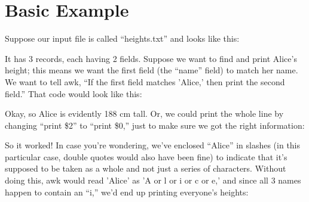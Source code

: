 \documentclass[12pt]{article}
\begin{document}
\pagebreak


\section*{Basic Example}

Suppose our input file is called ``heights.txt'' and looks like this:

\ttfamily
\colorbox{black}{}
\normalfont

It has 3 records, each having 2 fields. Suppose we want to find and print Alice's height; this means we want the first field (the ``name'' field) to match her name. We want to tell awk, ``If the first field matches 'Alice,' then print the second field.'' That code would look like this:

\ttfamily
\colorbox{black}{}
\normalfont

Okay, so Alice is evidently 188 cm tall. Or, we could print the whole line by changing ``print \$2'' to ``print \$0,'' just to make sure we got the right information:

\ttfamily
\colorbox{black}{}
\normalfont

So it worked! In case you're wondering, we've enclosed ``Alice'' in slashes (in this particular case, double quotes would also have been fine) to indicate that it's supposed to be taken as a whole and not just a series of characters. Without doing this, awk would read 'Alice' as 'A or l or i or c or e,' and since all 3 names happen to contain an ``i,'' we'd end up printing everyone's heights:
\end{document}
